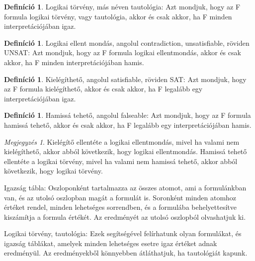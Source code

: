 \documentclass[
]{thesis-ekf}
\theoremstyle{definition}
\newtheorem{definicio}[tetel]{Definíció}
\theoremstyle{remark}
\newtheorem{megjegyzes}[tetel]{Megjegyzés}
\begin{document}
	\begin{definicio}\label{def-tautologia}
		Logikai törvény, más néven tautológia: Azt mondjuk, hogy az F formula logikai törvény, vagy tautológia, akkor és csak akkor, ha F minden interpretációjában igaz.
	\end{definicio}

	\begin{definicio}
		Logikai ellent mondás, angolul contradiction, unsatisfiable, röviden UNSAT: Azt mondjuk, hogy az F formula logikai ellentmondás, akkor és csak akkor, ha F minden interpretációjában hamis.
	\end{definicio}

	\begin{definicio}
		Kielégíthető, angolul satisfiable, röviden \textsc{SAT}: Azt mondjuk, hogy az F formula kielégíthető, akkor és csak akkor, ha F legalább egy interpretációjában igaz.
	\end{definicio}

	\begin{definicio}
		Hamissá tehető, angolul falseable: Azt mondjuk, hogy az F formula hamissá tehető, akkor és csak akkor, ha F legalább egy interpretációjában hamis. 
	\end{definicio}

	\begin{megjegyzes}
		Kielégítő ellentéte a logikai ellentmondás, mivel ha valami nem kielégíthető, akkor abból következik, hogy logikai ellentmondás.
		Hamissá tehető ellentéte a logikai törvény, mivel ha valami nem hamissá tehető, akkor abból következik, hogy logikai törvény.
	\end{megjegyzes}

	Igazság tábla: Oszloponként tartalmazza az összes atomot, ami a formulánkban van, és az utolsó oszlopban magát a formulát is. Soronként minden atomhoz értéket rendel, minden lehetséges sorrendben, és a formulába behelyettesítve kiszámítja a formula értékét. Az eredményét az utolsó oszlopból olvashatjuk ki.
	
	Logikai törvény, tautológia: Ezek segítségével felírhatunk olyan formulákat, és igazság táblákat, amelyek minden lehetséges esetre igaz értéket adnak eredményül. Az eredményekből könnyebben átláthatjuk, ha tautológiát kapunk.
	
\end{document}
